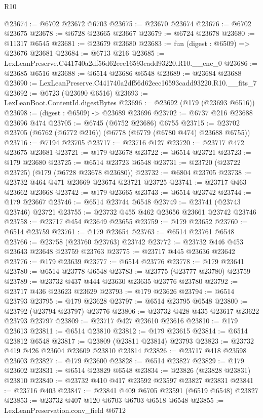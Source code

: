 \begin{lexlean}{R10}
\begin{coremodule}
@23674 := @6702 @23672 @6703
@23675 := @23670 @23674
@23676 := @6702 @23675
@23678 := @6728 @23665 @23667
@23679 := @6724 @23678
@23680 := @11317 @6545
@23681 := @23679 @23680
@23683 := fun (digest : @6509) => @23676 @23681
@23684 := @6713 @216
@23685 := LexLeanPreserve.C441740a2df56d62eec16593cadd93220.R10.__enc_0
@23686 := @23685 @6516
@23688 := @6514 @23686 @6548
@23689 := @23684 @23688
@23690 := LexLeanPreserve.C441740a2df56d62eec16593cadd93220.R10.__fits_7
@23692 := @6723 (@23690 @6516)
@23693 := LexLeanBoot.ContentId.digestBytes
@23696 := @23692 (@179 (@23693 @6516))
@23698 := (digest : @6509) -> @23689 @23696
@23702 := @6737 @216 @23688 @23696 @474
@23705 := @6745 (@6752 @23686) @6755
@23715 := @23702 @23705 (@6762 (@6772 @216)) (@6778 (@6779 (@6780 @474) @23688 @6755))
@23716 := @7194 @23705
@23717 := @23716 @127
@23720 := @23717 @472 @23675 @23681
@23721 := @179 @23678
@23722 := @6514 @23721
@23723 := @179 @23680
@23725 := @6514 @23723 @6548
@23731 := @23720 (@23722 @23725) (@179 (@6728 @23678 @23680))
@23732 := @6804 @23705
@23738 := @23732 @464 @471 @23669 @23674 @23721 @23725
@23741 := @23717 @463 @23662 @23668
@23742 := @179 @23665
@23743 := @6514 @23742
@23744 := @179 @23667
@23746 := @6514 @23744 @6548
@23749 := @23741 (@23743 @23746) @23721
@23755 := @23732 @455 @462 @23656 @23661 @23742 @23746
@23758 := @23717 @454 @23649 @23655
@23759 := @179 @23652
@23760 := @6514 @23759
@23761 := @179 @23654
@23763 := @6514 @23761 @6548
@23766 := @23758 (@23760 @23763) @23742
@23772 := @23732 @446 @453 @23643 @23648 @23759 @23763
@23775 := @23717 @445 @23636 @23642
@23776 := @179 @23639
@23777 := @6514 @23776
@23778 := @179 @23641
@23780 := @6514 @23778 @6548
@23783 := @23775 (@23777 @23780) @23759
@23789 := @23732 @437 @444 @23630 @23635 @23776 @23780
@23792 := @23717 @436 @23623 @23629
@23793 := @179 @23626
@23794 := @6514 @23793
@23795 := @179 @23628
@23797 := @6514 @23795 @6548
@23800 := @23792 (@23794 @23797) @23776
@23806 := @23732 @428 @435 @23617 @23622 @23793 @23797
@23809 := @23717 @427 @23610 @23616
@23810 := @179 @23613
@23811 := @6514 @23810
@23812 := @179 @23615
@23814 := @6514 @23812 @6548
@23817 := @23809 (@23811 @23814) @23793
@23823 := @23732 @419 @426 @23604 @23609 @23810 @23814
@23826 := @23717 @418 @23598 @23603
@23827 := @179 @23600
@23828 := @6514 @23827
@23829 := @179 @23602
@23831 := @6514 @23829 @6548
@23834 := @23826 (@23828 @23831) @23810
@23840 := @23732 @410 @417 @23592 @23597 @23827 @23831
@23841 := @23716 @403
@23847 := @23841 @409 @6705 @23591 (@6519 @6548) @23827
@23853 := @23732 @407 @120 @6703 @6703 @6518 @6548
@23855 := LexLeanPreservation.conv_field @6712

\end{coremodule}
\end{lexlean}
